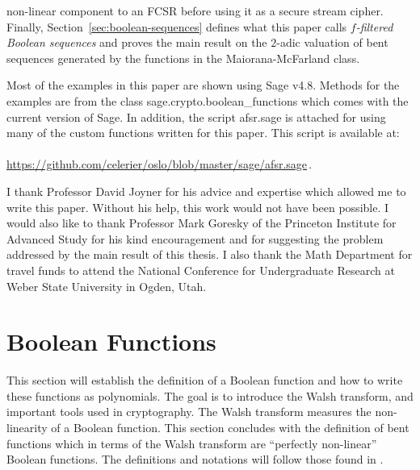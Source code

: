 \documentclass[english]{article}
\theoremstyle{plain}
\theoremstyle{definition}
\theoremstyle{remark}
\begin{document}
non-linear component to an FCSR before using it as a secure stream cipher. Finally,
Section~\ref{sec:boolean-sequences} defines what this paper calls {\it
$f$-filtered Boolean sequences} and proves the main result on the $2$-adic
valuation of bent sequences generated by the functions in the Maiorana-McFarland
class.
\par Most of the examples in this paper are shown using {\ttfamily Sage v4.8}.
Methods for the examples are from the class {\ttfamily
sage.crypto.boolean\_functions} which comes with the current version of
{\ttfamily Sage}. In addition, the script {\ttfamily afsr.sage} is attached for
using many of the custom functions written for this paper. This script is
available at:\\
\,\\
\url{https://github.com/celerier/oslo/blob/master/sage/afsr.sage}\,.

\vskip 0.2in
 I thank Professor David Joyner for his
advice and expertise which allowed me to write this paper. Without his help,
this work would not have been possible. I would also like to thank
Professor Mark Goresky of the Princeton Institute for Advanced Study for
his kind encouragement and for suggesting the problem addressed by the
main result of this thesis. I also thank the Math Department for travel
funds to attend the National Conference for Undergraduate Research at
Weber State University in Ogden, Utah.

\section{Boolean Functions}\label{sec:boolean-functions}
\par This section will establish the definition of a Boolean function
and how to write these functions as polynomials. The goal is to introduce the
Walsh transform, and important tools used in cryptography. The Walsh transform
measures the non-linearity of a Boolean function. This section concludes with
the definition of bent functions which in terms of the Walsh transform are
``perfectly non-linear'' Boolean functions. The definitions and
notations will follow those found in \cite{bk:cs09}.
\end{document}
